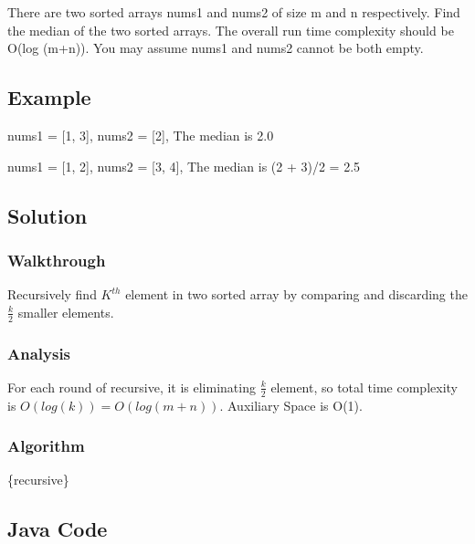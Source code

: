 \documentclass[]{book}
\begin{document}
There are two sorted arrays nums1 and nums2 of size m and n respectively. Find the median of the two sorted
arrays. The overall run time complexity should be O(log (m+n)). You may assume nums1 and nums2 cannot be both
empty.

\hypertarget{example-10}{%
\subsection{Example}\label{example-10}}

nums1 = {[}1, 3{]}, nums2 = {[}2{]}, The median is 2.0

nums1 = {[}1, 2{]}, nums2 = {[}3, 4{]}, The median is (2 + 3)/2 = 2.5

\hypertarget{solution-8}{%
\subsection{Solution}\label{solution-8}}

\hypertarget{walkthrough-10}{%
\subsubsection{Walkthrough}\label{walkthrough-10}}

Recursively find \(K^{th}\) element in two sorted array by comparing and discarding the \(\frac{k}{2}\) smaller
elements.

\hypertarget{analysis-12}{%
\subsubsection{Analysis}\label{analysis-12}}

For each round of recursive, it is eliminating \(\frac{k}{2}\) element, so total time complexity is
\(O(log(k)) = O(log(m + n))\). Auxiliary Space is O(1).

\hypertarget{algorithm-12}{%
\subsubsection{Algorithm}\label{algorithm-12}}

\{recursive\}

\hypertarget{java-code-10}{%
\subsection{Java Code}\label{java-code-10}}
\end{document}
